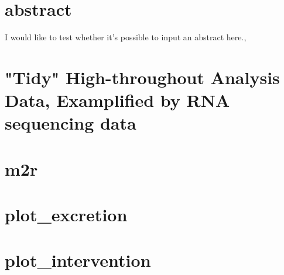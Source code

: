 \section{abstract}
	I would like to test whether it's possible to input an abstract here.,

\section{"Tidy" High-throughout Analysis Data, Examplified by RNA sequencing data}

\section{m2r}

\section{plot\_excretion}

\section{plot\_intervention}